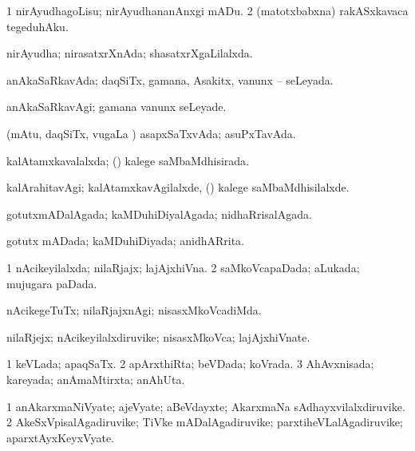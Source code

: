 \bentry
{} 
\gl{\sakirx}
\expl{}
\bmng
\bnum
\num{1} nirAyudhagoLisu; nirAyudhananAnxgi mADu. 
\num{2} (matotxbabxna) rakASxkavaca tegeduhAku. 
\enum
\emng
\eentry

\bentry
{} 
\gl{\gu}
\expl{}
\bmng
nirAyudha; nirasatxrXnAda; shasatxrXgaLilalxda. 
\emng
\eentry

\bentry
{} 
\gl{\gu}
\expl{}
\bmng
anAkaSaRkavAda; daqSiTx, gamana, Asakitx, \mo vanunx -- seLeyada. 
\emng
\eentry

\bentry
{} 
\gl{\kirxvi}
\expl{}
\bmng
anAkaSaRkavAgi; gamana \mo vanunx seLeyade. 
\emng
\eentry

\bentry
{} 
\gl{\gu}
\expl{}
\bmng
(mAtu, daqSiTx, \mo vugaLa \vi) asapxSaTxvAda; asuPxTavAda. 
\emng
\eentry

\bentry
{} 
\gl{\gu}
\expl{}
\bmng
kalAtamxkavalalxda; (\kanmu) kalege saMbaMdhisirada. 
\emng
\eentry

\bentry
{} 
\gl{\kirxvi}
\expl{}
\bmng
kalArahitavAgi; kalAtamxkavAgilalxde, (\kanmu) kalege saMbaMdhisilalxde. 
\emng
\eentry

\bentry
{} 
\gl{\gu}
\expl{}
\bmng
gotutxmADalAgada; kaMDuhiDiyalAgada; nidhaRrisalAgada. 
\emng
\eentry

\bentry
{} 
\gl{\gu}
\expl{}
\bmng
gotutx mADada; kaMDuhiDiyada; anidhARrita. 
\emng
\eentry

\bentry
{} 
\gl{\gu}
\expl{}
\bmng
\bnum
\num{1} nAcikeyilalxda; nilaRjajx; lajAjxhiVna. 
\num{2} saMkoVcapaDada; aLukada; mujugara paDada. 
\enum
\emng
\eentry

\bentry
{} 
\gl{\kirxvi}
\expl{}
\bmng
nAcikegeTuTx; nilaRjajxnAgi; nisasxMkoVcadiMda. 
\emng
\eentry

\bentry
{} 
\gl{\nA}
\expl{}
\bmng
nilaRjejx; nAcikeyilalxdiruvike; nisasxMkoVca; lajAjxhiVnate. 
\emng
\eentry

\bentry
{} 
\gl{\gu}
\expl{}
\bmng
\bnum
\num{1} keVLada; apaqSaTx. 
\num{2} apArxthiRta; beVDada; koVrada. 
\num{3} AhAvxnisada; kareyada; anAmaMtirxta; anAhUta. 
\enum
\emng
\eentry

\bentry
{} 
\gl{\nA}
\expl{}
\bmng
\bnum
\num{1} anAkarxmaNiVyate; ajeVyate; aBeVdayxte; AkarxmaNa sAdhayxvilalxdiruvike. 
\num{2} AkeSxVpisalAgadiruvike; TiVke mADalAgadiruvike; parxtiheVLalAgadiruvike; aparxtAyxKeyxVyate. 
\enum
\emng
\eentry


